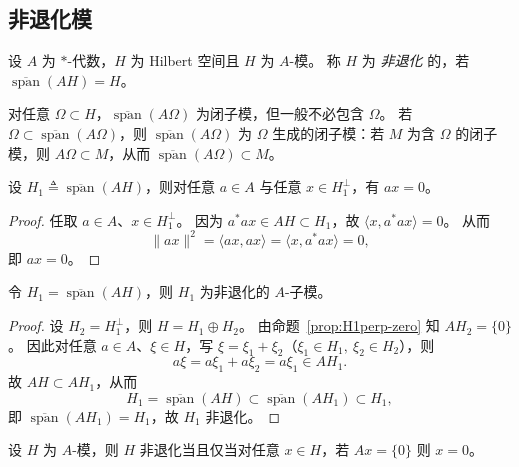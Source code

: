 \documentclass[lang=cn,a4paper,newtx,section]{elegantbook}
\begin{document}
\subsection{非退化模}

\begin{definition}
  设 $A$ 为 $*$-代数，$H$ 为 Hilbert 空间且 $H$ 为 $A$-模。
  称 $H$ 为 \emph{非退化} 的，若 $\overline{\operatorname{span}}(AH)=H$。
\end{definition}

\begin{remark}
  对任意 $\Omega\subset H$，$\overline{\operatorname{span}}(A\Omega)$ 为闭子模，但一般不必包含 $\Omega$。
  若 $\Omega\subset\overline{\operatorname{span}}(A\Omega)$，则 $\overline{\operatorname{span}}(A\Omega)$ 为 $\Omega$ 生成的闭子模：若 $M$ 为含 $\Omega$ 的闭子模，则 $A\Omega\subset M$，从而 $\overline{\operatorname{span}}(A\Omega)\subset M$。
\end{remark}

\begin{proposition}\label{prop:H1perp-zero}
  设 $H_{1}\triangleq\overline{\operatorname{span}}(AH)$，则对任意 $a\in A$ 与任意 $x\in H_{1}^{\perp}$，有 $ax=0$。
\end{proposition}

\begin{proof}
  任取 $a\in A$、$x\in H_{1}^{\perp}$。
  因为 $a^{*}ax\in AH\subset H_{1}$，故 $\langle x,a^{*}ax\rangle=0$。
  从而
  \[
    \|ax\|^{2}=\langle ax,ax\rangle=\langle x,a^{*}ax\rangle=0,
  \]
  即 $ax=0$。
\end{proof}

\begin{proposition}
  令 $H_{1}=\overline{\operatorname{span}}(AH)$，则 $H_{1}$ 为非退化的 $A$-子模。
\end{proposition}

\begin{proof}
  设 $H_{2}=H_{1}^{\perp}$，则 $H=H_{1}\oplus H_{2}$。
  由命题~\ref{prop:H1perp-zero} 知 $AH_{2}=\{0\}$。
  因此对任意 $a\in A$、$\xi\in H$，写 $\xi=\xi_{1}+\xi_{2}$（$\xi_{1}\in H_{1},\ \xi_{2}\in H_{2}$），则
  \[
    a\xi=a\xi_{1}+a\xi_{2}=a\xi_{1}\in AH_{1}.
  \]
  故 $AH\subset AH_{1}$，从而
  \[
    H_{1}=\overline{\operatorname{span}}(AH)\subset\overline{\operatorname{span}}(AH_{1})\subset H_{1},
  \]
  即 $\overline{\operatorname{span}}(AH_{1})=H_{1}$，故 $H_{1}$ 非退化。
\end{proof}

\begin{proposition}\label{prop:nondegen-equiv}
  设 $H$ 为 $A$-模，则 $H$ 非退化当且仅当对任意 $x\in H$，若 $Ax=\{0\}$ 则 $x=0$。
\end{proposition}
\end{document}
